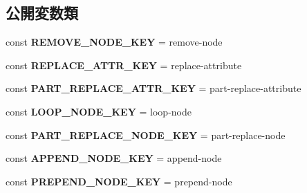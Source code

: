 \subsection*{公開変数類}
\begin{DoxyCompactItemize}
\item 
\hypertarget{class_html_view_assignor_a55fe24cb7ed56bfddba52ea6ae86c06c}{}const {\bfseries R\+E\+M\+O\+V\+E\+\_\+\+N\+O\+D\+E\+\_\+\+K\+E\+Y} = \textquotesingle{}remove-\/node\textquotesingle{}\label{class_html_view_assignor_a55fe24cb7ed56bfddba52ea6ae86c06c}

\item 
\hypertarget{class_html_view_assignor_a3fd055815fb7146c7416e91c6f168f38}{}const {\bfseries R\+E\+P\+L\+A\+C\+E\+\_\+\+A\+T\+T\+R\+\_\+\+K\+E\+Y} = \textquotesingle{}replace-\/attribute\textquotesingle{}\label{class_html_view_assignor_a3fd055815fb7146c7416e91c6f168f38}

\item 
\hypertarget{class_html_view_assignor_a89251f2036a8ff2aad86966eebc8c88a}{}const {\bfseries P\+A\+R\+T\+\_\+\+R\+E\+P\+L\+A\+C\+E\+\_\+\+A\+T\+T\+R\+\_\+\+K\+E\+Y} = \textquotesingle{}part-\/replace-\/attribute\textquotesingle{}\label{class_html_view_assignor_a89251f2036a8ff2aad86966eebc8c88a}

\item 
\hypertarget{class_html_view_assignor_aba975288e6cda73bb73c8dd36c4932a1}{}const {\bfseries L\+O\+O\+P\+\_\+\+N\+O\+D\+E\+\_\+\+K\+E\+Y} = \textquotesingle{}loop-\/node\textquotesingle{}\label{class_html_view_assignor_aba975288e6cda73bb73c8dd36c4932a1}

\item 
\hypertarget{class_html_view_assignor_a9a88188a8eb3ec085e8da796741ccdcc}{}const {\bfseries P\+A\+R\+T\+\_\+\+R\+E\+P\+L\+A\+C\+E\+\_\+\+N\+O\+D\+E\+\_\+\+K\+E\+Y} = \textquotesingle{}part-\/replace-\/node\textquotesingle{}\label{class_html_view_assignor_a9a88188a8eb3ec085e8da796741ccdcc}

\item 
\hypertarget{class_html_view_assignor_aca5fa64480f892321c22ceaf8c03953c}{}const {\bfseries A\+P\+P\+E\+N\+D\+\_\+\+N\+O\+D\+E\+\_\+\+K\+E\+Y} = \textquotesingle{}append-\/node\textquotesingle{}\label{class_html_view_assignor_aca5fa64480f892321c22ceaf8c03953c}

\item 
\hypertarget{class_html_view_assignor_aed8b9b2e3891f9af8055b7fc26003dca}{}const {\bfseries P\+R\+E\+P\+E\+N\+D\+\_\+\+N\+O\+D\+E\+\_\+\+K\+E\+Y} = \textquotesingle{}prepend-\/node\textquotesingle{}\label{class_html_view_assignor_aed8b9b2e3891f9af8055b7fc26003dca}


\end{DoxyCompactItemize}
